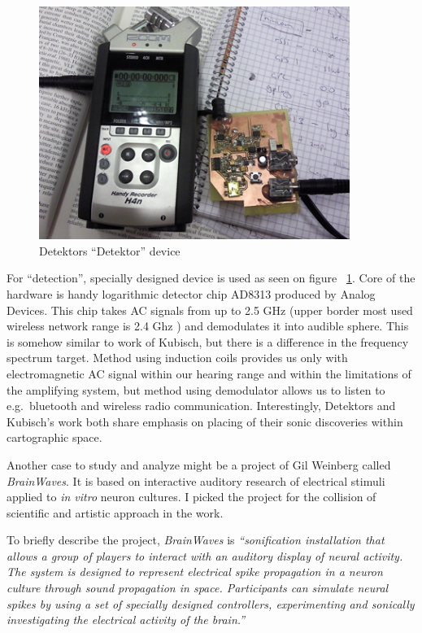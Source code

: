 \documentclass[12pt,a4paper,oneside]{report}
\begin{document}
\begin{figure}  
  \centering
    \includegraphics[width=0.9\textwidth]{img/detektor}
	\caption{Detektors ``Detektor'' device}
	\label{fig:detektor}
\end{figure}

For ``detection'', specially designed device is used as seen on figure ~\ref{fig:detektor}. Core of the hardware is handy logarithmic detector chip AD8313 produced by Analog Devices. This chip takes AC signals from up to 2.5 GHz  (upper border most used wireless network range is 2.4 Ghz \cite{802}) and demodulates it into audible sphere. This is somehow similar to work of Kubisch, but there is a difference in the frequency spectrum target. Method using induction coils provides us only with electromagnetic AC signal within our hearing range and within the limitations of the amplifying system, but method using demodulator allows us to listen to e.g.\ bluetooth and wireless radio communication. Interestingly, Detektors and Kubisch's work both share emphasis on placing of their sonic discoveries within cartographic space.

Another case to study and analyze might be a project of Gil Weinberg called \emph{BrainWaves}. It is based on interactive auditory research of electrical stimuli applied to \emph{in vitro} neuron cultures. I picked the project for the collision of scientific and artistic approach in the work.

To briefly describe the project, \emph{BrainWaves} is \emph{``sonification installation that allows a group of players to interact with an auditory display of neural activity. The system is designed to represent electrical spike propagation in a neuron culture through sound propagation in space. Participants can simulate neural spikes by using a set of specially designed controllers, experimenting and sonically investigating the electrical activity of the brain.''} \cite{Weinberg2006}
\end{document}
